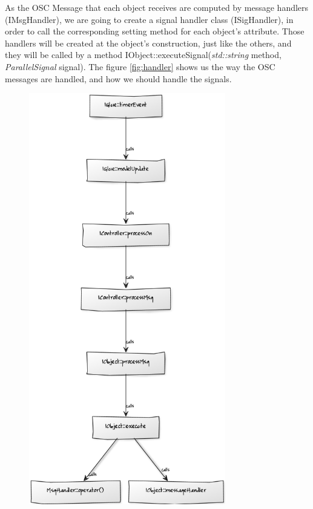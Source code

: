 \documentclass[a4paper]{article}
\begin{document}
As the OSC Message that each object receives are computed by message handlers (IMsgHandler), we are going to create a signal handler class (ISigHandler), in order to call the corresponding setting method for each object's attribute. 
Those handlers will be created at the object's construction, just like the others, and they will be called by a method IObject::executeSignal(\textit{std::string} method, \textit{ParallelSignal} signal). The figure \ref{fig:handler} shows us the way the OSC messages are handled, and how we should handle the signals.
\\

\begin{figure}[h]
\hspace{-3cm}
\includegraphics[height=18cm]{img/schema1.png}

\end{figure}
\end{document}

